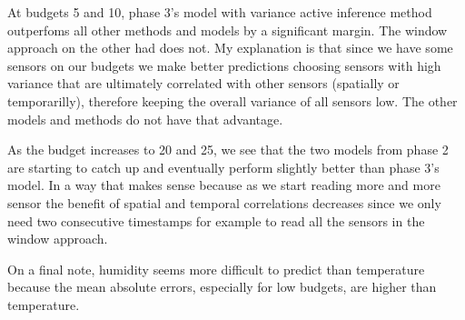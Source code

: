 \documentclass{article}
\begin{document}
At budgets 5 and 10, phase 3's model with variance
active inference method outperfoms all other methods
and models by a significant margin. The window approach
on the other had does not. My explanation is that since
we have some sensors on our budgets we make better
predictions choosing sensors with high variance that
are ultimately correlated with other sensors (spatially
or temporarilly), therefore keeping the overall variance
of all sensors low. The other models and methods do not
have that advantage.

As the budget increases to 20 and 25, we see that the
two models from phase 2 are starting to catch up and
eventually perform slightly better than phase 3's model.
In a way that makes sense because as we start reading
more and more sensor the benefit of spatial and
temporal correlations decreases since we only need
two consecutive timestamps for example to read all
the sensors in the window approach.

On a final note, humidity seems more difficult to
predict than temperature because the mean absolute
errors, especially for low budgets, are higher than
temperature.
\end{document}
